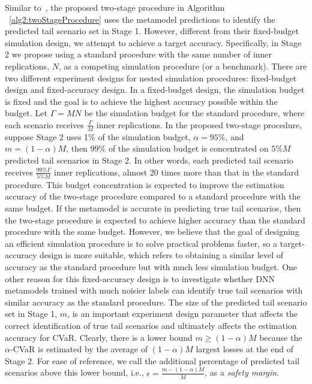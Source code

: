 Similar to~\cite{dang2020efficient}, the proposed two-stage procedure in Algorithm ~\ref{alg2:twoStageProcedure} uses the metamodel predictions to identify the predicted tail scenario set in Stage 1.
However, different from their fixed-budget simulation design, we attempt to achieve a target accuracy.
Specifically, in Stage 2 we propose using a standard procedure with the same number of inner replications, $N$, as a competing simulation procedure (or a benchmark).
There are two different experiment designs for nested simulation procedures: fixed-budget design and fixed-accuracy design.
In a fixed-budget design, the simulation budget is fixed and the goal is to achieve the highest accuracy possible within the budget.
Let $\Gamma = MN$ be the simulation budget for the standard procedure, where each scenario receives $\frac{\Gamma}{M}$ inner replications.
In the proposed two-stage procedure, suppose Stage 2 uses 1\% of the simulation budget, $\alpha = 95\%$, and $m=(1-\alpha)M$, then $99\%$ of the simulation budget is concentrated on $5\% M$ predicted tail scenarios in Stage 2.
In other words, each predicted tail scenario receives $\frac{99\% \Gamma}{5\% M}$ inner replications, almost 20 times more than that in the standard procedure.
This budget concentration is expected to improve the estimation accuracy of the two-stage procedure compared to a standard procedure with the same budget. 
If the metamodel is accurate in predicting true tail scenarios, then the two-stage procedure is expected to achieve higher accuracy than the standard procedure with the same budget.
However, we believe that the goal of designing an efficient simulation procedure is to solve practical problems faster, so a target-accuracy design is more suitable, which refers to obtaining a similar level of accuracy as the standard procedure but with much less simulation budget.
One other reason for this fixed-accuracy design is to investigate whether DNN metamodels trained with much noisier labels can identify true tail scenarios with similar accuracy as the standard procedure.
The size of the predicted tail scenario set in Stage 1, $m$, is an important experiment design parameter that affects the correct identification of true tail scenarios and ultimately affects the estimation accuracy for CVaR.
Clearly, there is a lower bound $m \geq (1-\alpha)M$ because the $\alpha$-CVaR is estimated by the average of $(1-\alpha)M$ largest losses at the end of Stage 2.
For ease of reference, we call the additional percentage of predicted tail scenarios above this lower bound, i.e., $\epsilon = \frac{m - (1-\alpha)M}{M}$, as a \textit{safety margin}.
